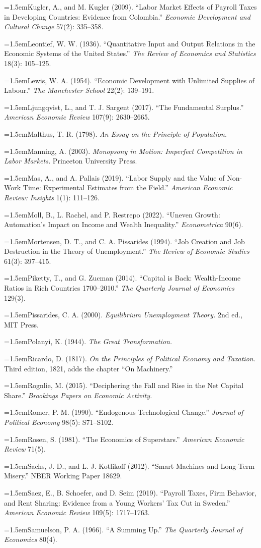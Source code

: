 \documentclass[12pt]{article}
\theoremstyle{plain}
\newcommand{\refentry}[1]{\par\hangindent=1.5em\hangafter=1\noindent #1}
\begin{document}
{\refentry{Kugler, A., and M. Kugler (2009). ``Labor Market Effects of Payroll Taxes in Developing Countries: Evidence from Colombia.'' \emph{Economic Development and Cultural Change} 57(2): 335--358.}
\refentry{Leontief, W. W. (1936). ``Quantitative Input and Output Relations in the Economic Systems of the United States.'' \emph{The Review of Economics and Statistics} 18(3): 105--125.}
\refentry{Lewis, W. A. (1954). ``Economic Development with Unlimited Supplies of Labour.'' \emph{The Manchester School} 22(2): 139--191.}
\refentry{Ljungqvist, L., and T. J. Sargent (2017). ``The Fundamental Surplus.'' \emph{American Economic Review} 107(9): 2630--2665.}
\refentry{Malthus, T. R. (1798). \emph{An Essay on the Principle of Population.}}
\refentry{Manning, A. (2003). \emph{Monopsony in Motion: Imperfect Competition in Labor Markets.} Princeton University Press.}
\refentry{Mas, A., and A. Pallais (2019). ``Labor Supply and the Value of Non-Work Time: Experimental Estimates from the Field.'' \emph{American Economic Review: Insights} 1(1): 111--126.}
\refentry{Moll, B., L. Rachel, and P. Restrepo (2022). ``Uneven Growth: Automation's Impact on Income and Wealth Inequality.'' \emph{Econometrica} 90(6).}
\refentry{Mortensen, D. T., and C. A. Pissarides (1994). ``Job Creation and Job Destruction in the Theory of Unemployment.'' \emph{The Review of Economic Studies} 61(3): 397--415.}
\refentry{Piketty, T., and G. Zucman (2014). ``Capital is Back: Wealth-Income Ratios in Rich Countries 1700--2010.'' \emph{The Quarterly Journal of Economics} 129(3).}
\refentry{Pissarides, C. A. (2000). \emph{Equilibrium Unemployment Theory.} 2nd ed., MIT Press.}
\refentry{Polanyi, K. (1944). \emph{The Great Transformation.}}
\refentry{Ricardo, D. (1817). \emph{On the Principles of Political Economy and Taxation.} Third edition, 1821, adds the chapter ``On Machinery.''}
\refentry{Rognlie, M. (2015). ``Deciphering the Fall and Rise in the Net Capital Share.'' \emph{Brookings Papers on Economic Activity.}}
\refentry{Romer, P. M. (1990). ``Endogenous Technological Change.'' \emph{Journal of Political Economy} 98(5): S71--S102.}
\refentry{Rosen, S. (1981). ``The Economics of Superstars.'' \emph{American Economic Review} 71(5).}
\refentry{Sachs, J. D., and L. J. Kotlikoff (2012). ``Smart Machines and Long-Term Misery.'' NBER Working Paper 18629.}
\refentry{Saez, E., B. Schoefer, and D. Seim (2019). ``Payroll Taxes, Firm Behavior, and Rent Sharing: Evidence from a Young Workers' Tax Cut in Sweden.'' \emph{American Economic Review} 109(5): 1717--1763.}
\refentry{Samuelson, P. A. (1966). ``A Summing Up.'' \emph{The Quarterly Journal of Economics} 80(4).}
}
\end{document}
